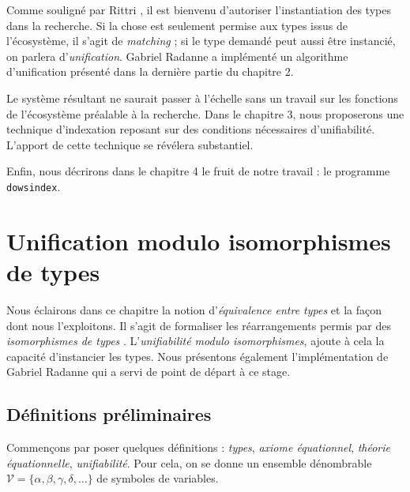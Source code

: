 \documentclass[a4paper]{report}
\theoremstyle{definition}
\newcommand{\dowsindex}{\texttt{dowsindex}\xspace}
\newcommand{\V}{\mathscr{V}}
\begin{document}
Comme souligné par Rittri \cite{Rittri93}, il est bienvenu d'autoriser l'instantiation des types dans la recherche. Si la chose est seulement permise aux types issus de l'écosystème, il s'agit de \emph{matching} ; si le type demandé peut aussi être instancié, on parlera d'\emph{unification}. Gabriel Radanne a implémenté un algorithme d'unification présenté dans la dernière partie du chapitre 2.

Le système résultant ne saurait passer à l'échelle sans un travail sur les fonctions de l'écosystème préalable à la recherche. Dans le chapitre 3, nous proposerons une technique d'indexation reposant sur des conditions nécessaires d'unifiabilité. L'apport de cette technique se révélera substantiel.

Enfin, nous décrirons dans le chapitre 4 le fruit de notre travail : le programme \dowsindex.


\chapter{Unification modulo isomorphismes de types}

Nous éclairons dans ce chapitre la notion d'\emph{équivalence entre types} et la façon dont nous l'exploitons. Il s'agit de formaliser les réarrangements permis par des \emph{isomorphismes de types} . L'\emph{unifiabilité modulo isomorphismes}, ajoute à cela la capacité d'instancier les types. Nous présentons également l'implémentation de Gabriel Radanne qui a servi de point de départ à ce stage.



\section{Définitions préliminaires}

Commençons par poser quelques définitions : \emph{types}, \emph{axiome équationnel}, \emph{théorie équationnelle}, \emph{unifiabilité}. Pour cela, on se donne un ensemble dénombrable $\V = \{ \alpha, \beta, \gamma, \delta, \dots \}$ de symboles de variables.
\end{document}
